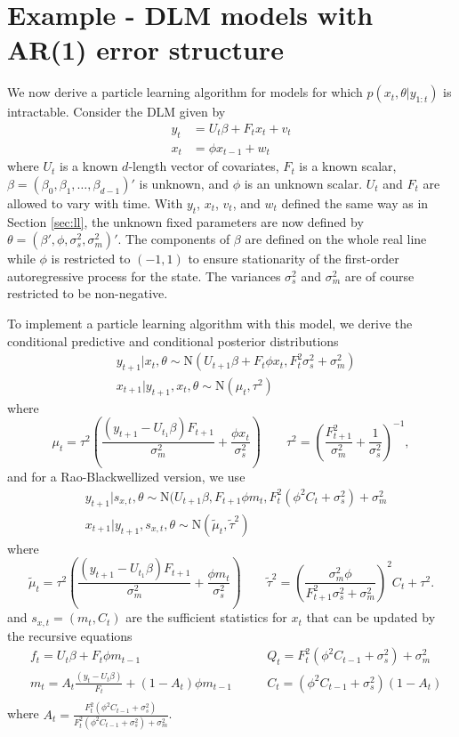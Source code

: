 \documentclass{article}
\begin{document}
\section{Example - DLM models with AR(1) error structure}

We now derive a particle learning algorithm for models for which $p(x_t,\theta|y_{1:t})$ is intractable. Consider the DLM given by
\begin{align}
y_t &= U_t\beta + F_tx_t + v_t \label{eqn:obs} \\
x_t &= \phi x_{t-1} + w_t \label{eqn:state}
\end{align}
where $U_t$ is a known $d$-length vector of covariates, $F_t$ is a known scalar, $\beta = (\beta_0,\beta_1,\ldots,\beta_{d-1})'$ is unknown, and $\phi$ is an unknown scalar. $U_t$ and $F_t$ are allowed to vary with time. With $y_t$, $x_t$, $v_t$, and $w_t$ defined the same way as in Section \ref{sec:ll}, the unknown fixed parameters are now defined by $\theta = (\beta',\phi,\sigma^2_s,\sigma^2_m)'$. The components of $\beta$ are defined on the whole real line while $\phi$ is restricted to $(-1,1)$ to ensure stationarity of the first-order autoregressive process for the state. The variances $\sigma^2_s$ and $\sigma^2_m$ are of course restricted to be non-negative.

To implement a particle learning algorithm with this model, we derive the conditional predictive and conditional posterior distributions
\begin{align*}
&y_{t+1}|x_t,\theta \sim \mbox{N}(U_{t+1}\beta + F_t\phi x_t, F_t^2\sigma^2_s + \sigma^2_m) \\
&x_{t+1}|y_{t+1},x_t,\theta \sim \mbox{N}(\mu_t,\tau^2)
\end{align*}
where \[\mu_t = \tau^2\left(\frac{(y_{t+1}-U_{t_1}\beta)F_{t+1}}{\sigma^2_m} + \frac{\phi x_t}{\sigma^2_s}\right) \qquad \tau^2 = \left(\frac{F_{t+1}^2}{\sigma^2_m} + \frac{1}{\sigma^2_s}\right)^{-1},\] and for a Rao-Blackwellized version, we use
\begin{align*}
&y_{t+1}|s_{x,t},\theta \sim \mbox{N}(U_{t+1}\beta,F_{t+1}\phi m_t, F_t^2(\phi^2 C_t + \sigma^2_s) + \sigma^2_m \\
&x_{t+1}|y_{t+1},s_{x,t},\theta \sim \mbox{N}(\tilde{\mu}_t,\tilde{\tau}^2)
\end{align*}
where \[\tilde{\mu}_t = \tau^2\left(\frac{(y_{t+1}-U_{t_1}\beta)F_{t+1}}{\sigma^2_m} + \frac{\phi m_t}{\sigma^2_s}\right) \qquad \tilde{\tau}^2 = \left(\frac{\sigma^2_m\phi}{F_{t+1}^2\sigma^2_s + \sigma^2_m}\right)^2C_t + \tau^2.\]
and $s_{x,t} = (m_t,C_t)$ are the sufficient statistics for $x_t$ that can be updated by the recursive equations
\begin{align*}
&f_t = U_t\beta + F_t\phi m_{t-1} \qquad &Q_t = F_t^2(\phi^2C_{t-1} + \sigma^2_s) + \sigma^2_m \\
&m_t = A_t\frac{(y_t - U_t\beta)}{F_t} + (1 - A_t)\phi m_{t-1} \qquad &C_t = (\phi^2C_{t-1} + \sigma^2_s)(1 - A_t) \\ 
\end{align*}
where $A_t = \frac{F_t^2(\phi^2C_{t-1} + \sigma^2_s)}{F_t^2(\phi^2C_{t-1} + \sigma^2_s) + \sigma^2_m}$.

\clearpage



\end{document}
